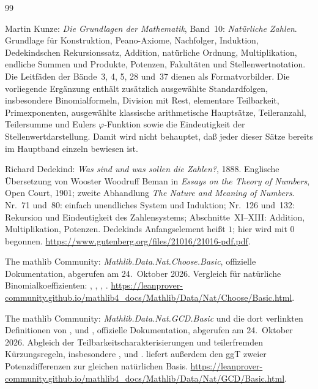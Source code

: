 \renewcommand{\bibname}{Quellen und Bandzuordnung}
\begin{thebibliography}{99}
\footnotesize
\setlength{\itemsep}{5pt}
\setlength{\parskip}{0pt}

Martin Kunze: \emph{Die Grundlagen der Mathematik}, Band~10:
\emph{Natürliche Zahlen}.
Grundlage für Konstruktion, Peano-Axiome, Nachfolger, Induktion,
Dedekindschen Rekursionssatz, Addition, natürliche Ordnung,
Multiplikation, endliche Summen und Produkte, Potenzen, Fakultäten
und Stellenwertnotation. Die Leitfäden der Bände~3, 4, 5, 28
und~37 dienen als Formatvorbilder.
Die vorliegende Ergänzung enthält zusätzlich ausgewählte
Standardfolgen, insbesondere Binomialformeln, Division mit Rest,
elementare Teilbarkeit, Primexponenten, ausgewählte klassische
arithmetische Hauptsätze, Teileranzahl, Teilersumme und Eulers
$\varphi$-Funktion sowie die Eindeutigkeit
der Stellenwertdarstellung. Damit wird nicht behauptet, daß
jeder dieser Sätze bereits im Hauptband einzeln bewiesen ist.

Richard Dedekind: \emph{Was sind und was sollen die Zahlen?}, 1888.
Englische Übersetzung von Wooster Woodruff Beman in
\emph{Essays on the Theory of Numbers}, Open Court, 1901;
zweite Abhandlung \emph{The Nature and Meaning of Numbers}.
Nr.~71 und~80: einfach unendliches System und Induktion;
Nr.~126 und~132: Rekursion und Eindeutigkeit des Zahlensystems;
Abschnitte~XI--XIII: Addition, Multiplikation, Potenzen.
Dedekinds Anfangselement heißt $1$; hier wird mit $0$ begonnen.
\url{https://www.gutenberg.org/files/21016/21016-pdf.pdf}.

The mathlib Community: \emph{Mathlib.Data.Nat.Choose.Basic},
offizielle Dokumentation, abgerufen am 24.~Oktober 2026.
Vergleich für natürliche Binomialkoeffizienten:
, ,
, .
\url{https://leanprover-community.github.io/mathlib4_docs/Mathlib/Data/Nat/Choose/Basic.html}.

The mathlib Community: \emph{Mathlib.Data.Nat.GCD.Basic} und
die dort verlinkten Definitionen von ,
 und , offizielle Dokumentation,
abgerufen am 24.~Oktober 2026.
Abgleich der Teilbarkeitscharakterisierungen und teilerfremden
Kürzungsregeln, insbesondere ,
 und .
 liefert außerdem den ggT
zweier Potenzdifferenzen zur gleichen natürlichen Basis.
\url{https://leanprover-community.github.io/mathlib4_docs/Mathlib/Data/Nat/GCD/Basic.html}.


\end{thebibliography}

